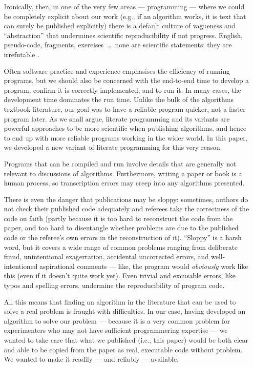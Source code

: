 \documentclass[12pt]{article}
\begin{document}
Ironically, then, in one of the very few areas --- programming --- where we could be completely explicit about our work (e.g., if an algorithm works, it is text that can surely be published explicitly) there is a default culture of vagueness and ``abstraction'' that undermines scientific reproducibility if not progress. English, pseudo-code, fragments, exercises~\ldots\ none are scientific statements: they are irrefutable \cite{popper}. 

Often software practice and experience emphasises the efficiency of running programs, but we should also be concerned with the end-to-end time to develop a program, confirm it is correctly implemented, and to run it. In many cases, the development time dominates the run time. Unlike the bulk of the algorithms textbook literature, our goal was to have a reliable program quicker, not a faster program later. As we shall argue, literate programming and its variants are powerful approaches to be more scientific when publishing algorithms, and hence to end up with more reliable programs working in the wider world. In this paper, we developed a new variant of literate programming for this very reason.

Programs that can be compiled and run involve details that are generally not relevant to discussions of algorithms. Furthermore, writing a paper or book is a human process, so transcription errors may creep into any algorithms presented. 

There is even the danger that publications may be sloppy: sometimes, authors do not check their published code adequately and referees take the correctness of the code on faith (partly because it is too hard to reconstruct the code from the paper, and too hard to disentangle whether problems are due to the published code or the referee's own errors in the reconstruction of it). ``Sloppy'' is a harsh word, but it covers a wide range of common problems ranging from deliberate fraud, unintentional exagerration, accidental uncorrected errors, and well-intentioned aspirational comments --- like, the program would \emph{obviously\/} work like this (even if it doesn't quite work yet). Even trivial and excusable errors, like typos and spelling errors, undermine the reproducibility of program code.

All this means that finding an algorithm in the literature that can be used to solve a real problem is fraught with difficulties. In our case, having developed an algorithm to solve our problem --- because it is a very common problem for experimenters who may not have sufficient programmering expertise --- we wanted to take care that what we published (i.e., this paper) would be both clear and able to be copied from the paper as real, executable code without problem. We wanted to make it readily --- and reliably --- available.
\end{document}

